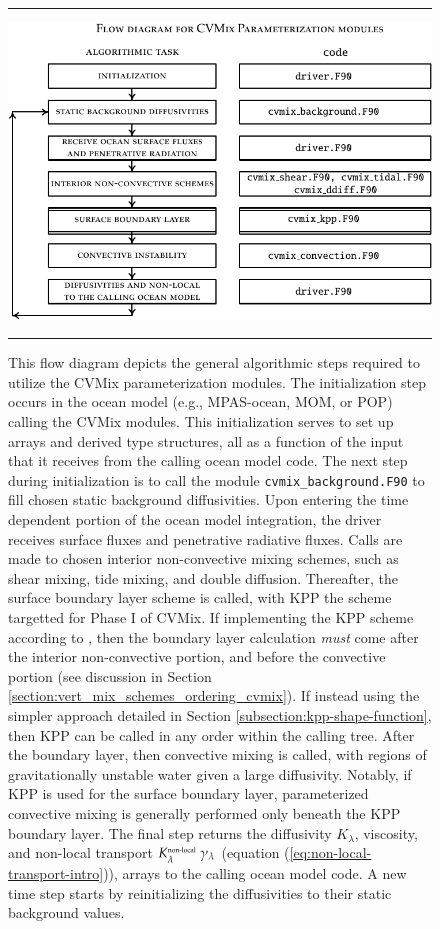 \begin{figure}[h!t]
\rule{\textwidth}{0.005in}
\begin{center}
\includegraphics[angle=0,width=15cm]{./mfpic_figs/cvmix_flow_diagram.pdf}
\caption[Flow diagram for CVMix schemes]{\sf This flow diagram depicts
  the general algorithmic steps required to utilize the CVMix
  parameterization modules.  The initialization step occurs in the
  ocean model (e.g., MPAS-ocean, MOM, or POP) calling the CVMix
  modules.  This initialization serves to set up arrays and derived
  type structures, all as a function of the input that it receives
  from the calling ocean model code.  The next step during
  initialization is to call the module {\tt cvmix\_background.F90} to
  fill chosen static background diffusivities.  Upon entering the time
  dependent portion of the ocean model integration, the driver
  receives surface fluxes and penetrative radiative fluxes.  Calls are
  made to chosen interior non-convective mixing schemes, such as shear
  mixing, tide mixing, and double diffusion.  Thereafter, the surface
  boundary layer scheme is called, with KPP the scheme targetted for
  Phase I of CVMix.  If implementing the KPP scheme according to
  \cite{LargeKPP}, then the boundary layer calculation {\it must} come
  after the interior non-convective portion, and before the convective
  portion (see discussion in Section
  \ref{section:vert_mix_schemes_ordering_cvmix}).  If instead using
  the simpler approach detailed in Section
  \ref{subsection:kpp-shape-function}, then KPP can be called in any
  order within the calling tree.  After the boundary layer, then
  convective mixing is called, with regions of gravitationally
  unstable water given a large diffusivity.  Notably, if KPP is used
  for the surface boundary layer, parameterized convective mixing is
  generally performed only beneath the KPP boundary layer.  The final
  step returns the diffusivity $K_{\lambda}$, viscosity, and non-local
  transport $K^{\mbox{\tiny non-local}}_{\lambda} \; \gamma_{\lambda}$
  (equation (\ref{eq:non-local-transport-intro})), arrays to the
  calling ocean model code.  A new time step starts by reinitializing
  the diffusivities to their static background values.}
\label{fig:vertical_mix_flow_cvmix}
\end{center}
\rule{\textwidth}{0.005in}
\end{figure}



